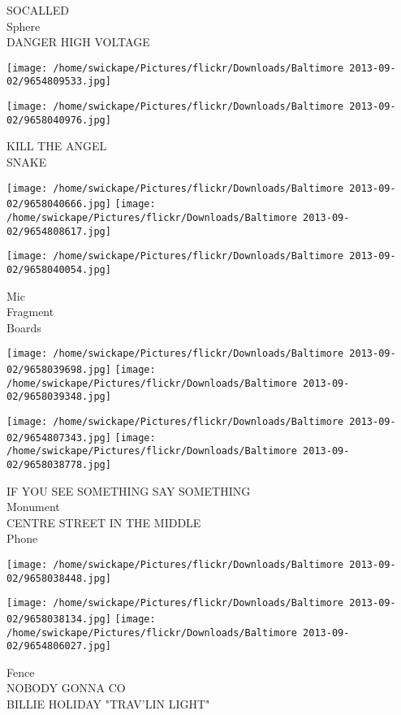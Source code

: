 \documentclass[10pt,letterpaper]{article}
\begin{document}
SOCALLED\\
Sphere\\
DANGER HIGH VOLTAGE
\pagebreak

\texttt{[image: /home/swickape/Pictures/flickr/Downloads/Baltimore 2013-09-02/9654809533.jpg]}

\vspace{0.25in}
\texttt{[image: /home/swickape/Pictures/flickr/Downloads/Baltimore 2013-09-02/9658040976.jpg]}

KILL THE ANGEL\\
SNAKE
\pagebreak

\texttt{[image: /home/swickape/Pictures/flickr/Downloads/Baltimore 2013-09-02/9658040666.jpg]}
\texttt{[image: /home/swickape/Pictures/flickr/Downloads/Baltimore 2013-09-02/9654808617.jpg]}

\vspace{0.25in}
\texttt{[image: /home/swickape/Pictures/flickr/Downloads/Baltimore 2013-09-02/9658040054.jpg]}

Mic\\
Fragment\\
Boards
\pagebreak

\texttt{[image: /home/swickape/Pictures/flickr/Downloads/Baltimore 2013-09-02/9658039698.jpg]}
\texttt{[image: /home/swickape/Pictures/flickr/Downloads/Baltimore 2013-09-02/9658039348.jpg]}

\texttt{[image: /home/swickape/Pictures/flickr/Downloads/Baltimore 2013-09-02/9654807343.jpg]}
\texttt{[image: /home/swickape/Pictures/flickr/Downloads/Baltimore 2013-09-02/9658038778.jpg]}

IF YOU SEE SOMETHING SAY SOMETHING\\
Monument\\
CENTRE STREET IN THE MIDDLE\\
Phone
\pagebreak

\texttt{[image: /home/swickape/Pictures/flickr/Downloads/Baltimore 2013-09-02/9658038448.jpg]}

\vspace{0.25in}
\texttt{[image: /home/swickape/Pictures/flickr/Downloads/Baltimore 2013-09-02/9658038134.jpg]}
\texttt{[image: /home/swickape/Pictures/flickr/Downloads/Baltimore 2013-09-02/9654806027.jpg]}

Fence\\
NOBODY GONNA CO\\
BILLIE HOLIDAY "TRAV'LIN LIGHT"
\pagebreak
\end{document}
